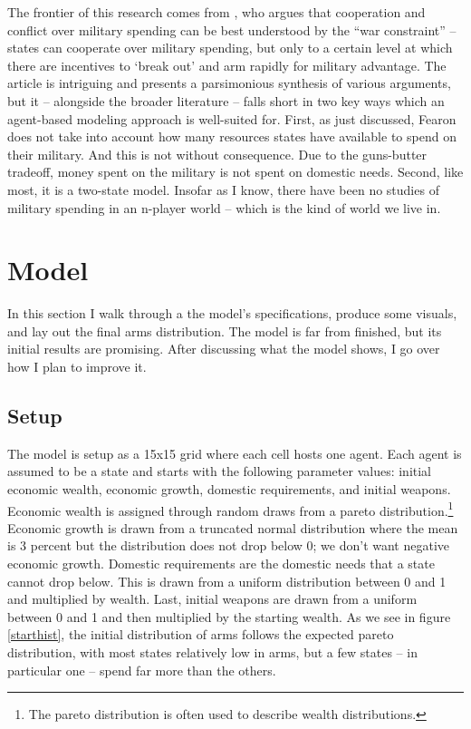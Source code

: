 \documentclass[12pt]{article}
\begin{document}
The frontier of this research comes from \citet{fearon2018}, who argues that cooperation and conflict over military spending can be best understood by the ``war constraint'' -- states can cooperate over military spending, but only to a certain level at which there are incentives to `break out' and arm rapidly for military advantage. The article is intriguing and presents a parsimonious synthesis of various arguments, but it -- alongside the broader literature -- falls short in two key ways which an agent-based modeling approach is well-suited for. First, as just discussed, Fearon does not take into account how many resources states have available to spend on their military. And this is not without consequence. Due to the guns-butter tradeoff, money spent on the military is not spent on domestic needs. Second, like most, it is a two-state model. Insofar as I know, there have been no studies of military spending in an n-player world -- which is the kind of world we live in.

\section{Model}\label{Model}

In this section I walk through a the model's specifications, produce some visuals, and lay out the final arms distribution. The model is far from finished, but its initial results are promising. After discussing what the model shows, I go over how I plan to improve it.

\subsection{Setup}\label{Setup}

The model is setup as a 15x15 grid where each cell hosts one agent. Each agent is assumed to be a state and starts with the following parameter values: initial economic wealth, economic growth, domestic requirements, and initial weapons. Economic wealth is assigned through random draws from a pareto distribution.\footnote{The pareto distribution is often used to describe wealth distributions.} Economic growth is drawn from a truncated normal distribution where the mean is 3 percent but the distribution does not drop below 0; we don't want negative economic growth. Domestic requirements are the domestic needs that a state cannot drop below. This is drawn from a uniform distribution between 0 and 1 and multiplied by wealth. Last, initial weapons are drawn from a uniform between 0 and 1 and then multiplied by the starting wealth. As we see in figure \ref{starthist}, the initial distribution of arms follows the expected pareto distribution, with most states relatively low in arms, but a few states -- in particular one -- spend far more than the others.
\end{document}
